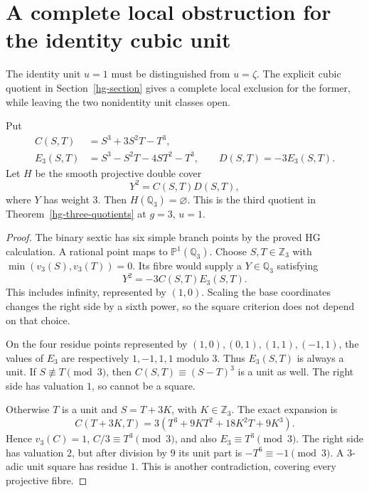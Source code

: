 \section{A complete local obstruction for the identity cubic unit}
\label{cl-section}

The identity unit \(u=1\) must be distinguished from \(u=\zeta\).
The explicit cubic quotient in Section~\ref{hg-section} gives a
complete local exclusion for the former, while leaving the two
nonidentity unit classes open.

\begin{theorem}
\label{cl-no-local-point}
Put
\begin{align*}
 C(S,T)&=S^3+3S^2T-T^3,\\
 E_3(S,T)&=S^3-S^2T-4ST^2-T^3,\qquad D(S,T)=-3E_3(S,T).
\end{align*}
Let \(H\) be the smooth projective double cover
\begin{equation}\label{cl-sextic}
 Y^2=C(S,T)D(S,T),
\end{equation}
where \(Y\) has weight \(3\). Then \(H(\mathbb Q_3)=\varnothing\).
This is the third quotient in Theorem~\ref{hg-three-quotients}
at \(g=3\), \(u=1\).
\end{theorem}
\begin{proof}
The binary sextic has six simple branch points by the proved HG
calculation. A rational point maps to \(\mathbb P^1(\mathbb Q_3)\).
Choose \(S,T\in\mathbb Z_3\) with \(\min(v_3(S),v_3(T))=0\).
Its fibre would supply a \(Y\in\mathbb Q_3\) satisfying
\[
 Y^2=-3C(S,T)E_3(S,T).
\]
This includes infinity, represented by \((1,0)\). Scaling the base
coordinates changes the right side by a sixth power, so the square
criterion does not depend on that choice.

On the four residue points represented by
\((1,0),(0,1),(1,1),(-1,1)\), the values of \(E_3\) are respectively
\(1,-1,1,1\) modulo \(3\). Thus \(E_3(S,T)\) is always a unit.
If \(S\not\equiv T\pmod3\), then
\(C(S,T)\equiv(S-T)^3\) is a unit as well. The right side has
valuation \(1\), so cannot be a square.

Otherwise \(T\) is a unit and \(S=T+3K\), with \(K\in\mathbb Z_3\).
The exact expansion is
\begin{equation}\label{cl-shift}
 C(T+3K,T)=3(T^3+9KT^2+18K^2T+9K^3).
\end{equation}
Hence \(v_3(C)=1\), \(C/3\equiv T^3\pmod3\), and also
\(E_3\equiv T^3\pmod3\). The right side has valuation \(2\), but
after division by \(9\) its unit part is
\(-T^6\equiv-1\pmod3\). A \(3\)-adic unit square has residue \(1\).
This is another contradiction, covering every projective fibre.
\end{proof}

